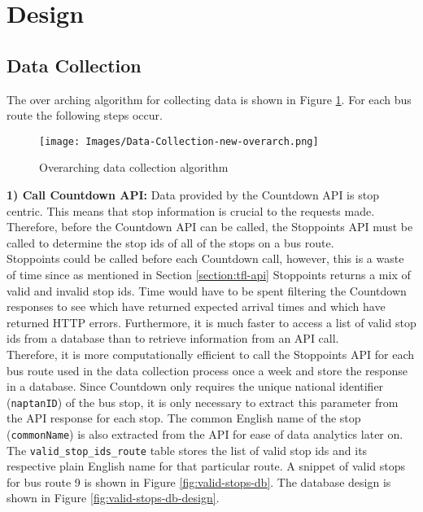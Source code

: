 \section{Design}

\subsection{Data Collection}

The over arching algorithm for collecting data is shown in Figure \ref{fig:main-flow}. For each bus route the following steps occur. \\

\begin{figure}[H]
\begin{center}
    \texttt{[image: Images/Data-Collection-new-overarch.png]}
    \caption{Overarching data collection algorithm}
    \label{fig:main-flow}
\end{center}
\end{figure}

\textbf{1) Call Countdown API:} Data provided by the Countdown API is stop centric. This means that stop information is crucial to the requests made. Therefore, before the Countdown API can be called, the Stoppoints API must be called to determine the stop ids of all of the stops on a bus route. \\ 

Stoppoints could be called before each Countdown call, however, this is a waste of time since as mentioned in Section \ref{section:tfl-api} Stoppoints returns a mix of valid and invalid stop ids. Time would have to be spent filtering the Countdown responses to see which have returned expected arrival times and which have returned HTTP errors. Furthermore, it is much faster to access a list of valid stop ids from a database than to retrieve information from an API call. \\

Therefore, it is more computationally efficient to call the Stoppoints API for each bus route used in the data collection process once a week and store the response in a database. Since Countdown only requires the unique national identifier (\texttt{naptanID}) of the bus stop, it is only necessary to extract this parameter from the API response for each stop. The common English name of the stop (\texttt{commonName}) is also extracted from the API for ease of data analytics later on. The  \texttt{valid\_stop\_ids\_route} table stores the list of valid stop ids and its respective plain English name for that particular route. A snippet of valid stops for bus route 9 is shown in Figure \ref{fig:valid-stops-db}. The database design is shown in Figure \ref{fig:valid-stops-db-design}. \\

